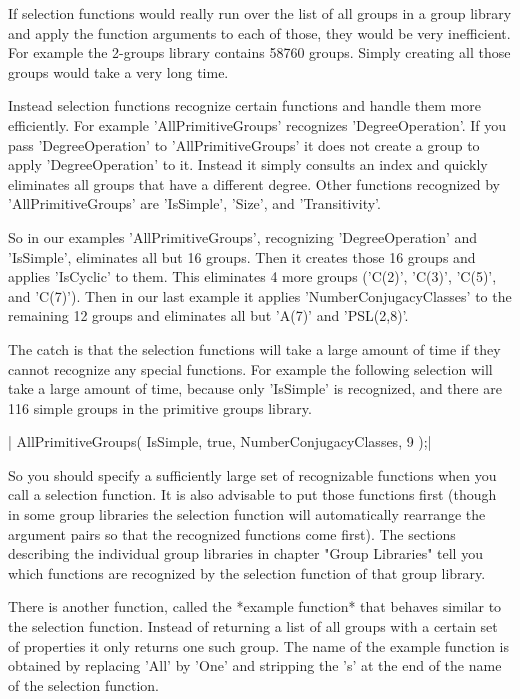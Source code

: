 If selection functions would really run over the list of all groups in  a
group  library  and apply the  function arguments to  each of those, they
would be  very inefficient.   For  example the  2-groups library contains
58760 groups.  Simply  creating all those groups would take  a  very long
time.

Instead selection functions  recognize certain functions  and handle them
more    efficiently.    For   example   'AllPrimitiveGroups'   recognizes
'DegreeOperation'.  If you pass 'DegreeOperation' to 'AllPrimitiveGroups'
it does not create a group to apply  'DegreeOperation' to it.  Instead it
simply consults  an index and quickly eliminates  all groups  that have a
different degree.  Other functions recognized by 'AllPrimitiveGroups' are
'IsSimple', 'Size', and 'Transitivity'.

So in our examples  'AllPrimitiveGroups',  recognizing  'DegreeOperation'
and 'IsSimple',  eliminates  all but 16 groups.  Then it creates those 16
groups and  applies 'IsCyclic'  to them.  This eliminates 4  more  groups
('C(2)', 'C(3)',  'C(5)', and  'C(7)').   Then in  our  last  example  it
applies  'NumberConjugacyClasses'  to   the  remaining   12   groups  and
eliminates all but 'A(7)' and 'PSL(2,8)'.

The catch is that the  selection  functions will  take a large amount  of
time  if they cannot  recognize any special  functions.  For example  the
following selection  will  take a  large  amount  of  time, because  only
'IsSimple'  is  recognized,  and  there  are  116  simple  groups in  the
primitive groups library.

|    AllPrimitiveGroups( IsSimple, true, NumberConjugacyClasses, 9 );|

So you should specify a  sufficiently large set of recognizable functions
when  you call  a selection function.   It is also advisable to put those
functions first (though in some group  libraries  the  selection function
will  automatically  rearrange the argument pairs so  that the recognized
functions come first).   The  sections  describing the  individual  group
libraries  in  chapter  "Group  Libraries"  tell you which  functions are
recognized by the selection function of that group library.

There is  another function,  called  the *example function*  that behaves
similar  to  the selection function.  Instead of returning a list of  all
groups with  a certain set of properties it  only returns one such group.
The name of the example function is obtained by replacing  'All' by 'One'
and stripping the 's' at the end of the name of the selection function.

